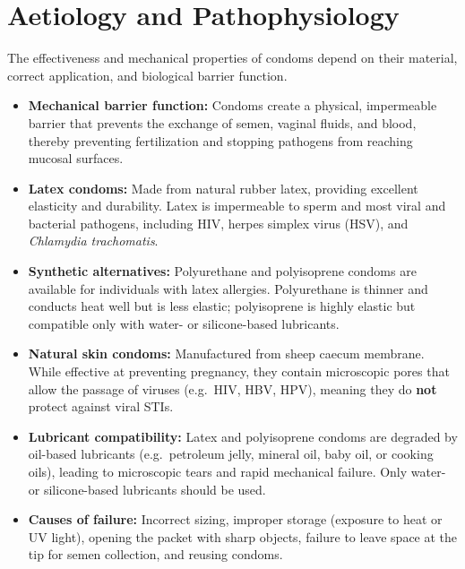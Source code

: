 \section*{Aetiology and Pathophysiology}
The effectiveness and mechanical properties of condoms depend on their material, correct application, and biological barrier function.
\begin{itemize}
    \item \textbf{Mechanical barrier function:} Condoms create a physical, impermeable barrier that prevents the exchange of semen, vaginal fluids, and blood, thereby preventing fertilization and stopping pathogens from reaching mucosal surfaces.
    \item \textbf{Latex condoms:} Made from natural rubber latex, providing excellent elasticity and durability. Latex is impermeable to sperm and most viral and bacterial pathogens, including HIV, herpes simplex virus (HSV), and \textit{Chlamydia trachomatis}.
    \item \textbf{Synthetic alternatives:} Polyurethane and polyisoprene condoms are available for individuals with latex allergies. Polyurethane is thinner and conducts heat well but is less elastic; polyisoprene is highly elastic but compatible only with water- or silicone-based lubricants.
    \item \textbf{Natural skin condoms:} Manufactured from sheep caecum membrane. While effective at preventing pregnancy, they contain microscopic pores that allow the passage of viruses (e.g.\ HIV, HBV, HPV), meaning they do \textbf{not} protect against viral STIs.
    \item \textbf{Lubricant compatibility:} Latex and polyisoprene condoms are degraded by oil-based lubricants (e.g.\ petroleum jelly, mineral oil, baby oil, or cooking oils), leading to microscopic tears and rapid mechanical failure. Only water- or silicone-based lubricants should be used.
    \item \textbf{Causes of failure:} Incorrect sizing, improper storage (exposure to heat or UV light), opening the packet with sharp objects, failure to leave space at the tip for semen collection, and reusing condoms.
\end{itemize}

